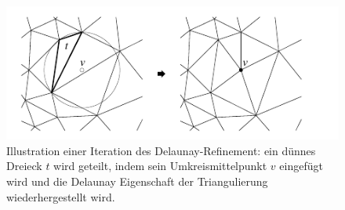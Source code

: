 

 \begin{figure}[h]
    \centering
    \includegraphics[width=5in]{images/delaunay_refinement.png}
    \caption{Illustration einer Iteration des Delaunay-Refinement: ein dünnes Dreieck $t$ wird geteilt, indem sein Umkreismittelpunkt $v$ eingefügt wird und die Delaunay Eigenschaft der Triangulierung wiederhergestellt wird. \cite{SHEWCHUK:2002:chuws} }
    \label{fig:delaunay_refinement}
\end{figure}



